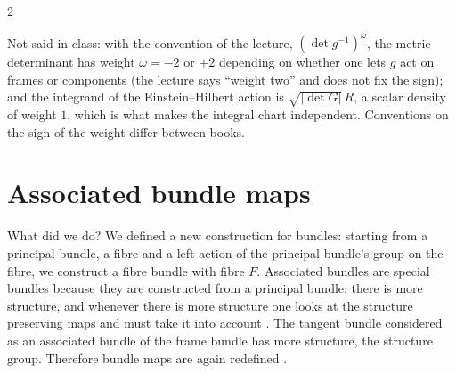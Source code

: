 \begin{paracol}{2}
\begin{coursenote}
Not said in class: with the convention of the lecture, $(\det g^{-1})^\omega$, the metric determinant has weight $\omega=-2$ or $+2$ depending on whether one lets $g$ act on frames or components (the lecture says ``weight two'' and does not fix the sign); and the integrand of the Einstein--Hilbert action is $\sqrt{|\det G|}\,R$, a scalar density of weight $1$, which is what makes the integral chart independent. Conventions on the sign of the weight differ between books. 
\end{coursenote}

\section{Associated bundle maps}\label{sec:ab-maps}

What did we do? We defined a new construction for bundles: starting from a principal bundle, a fibre and a left action of the principal bundle's group on the fibre, we construct a fibre bundle with fibre $F$. Associated bundles are special bundles because they are constructed from a principal bundle: there is more structure, and whenever there is more structure one looks at the structure preserving maps and must take it into account   . The tangent bundle considered as an associated bundle of the frame bundle has more structure, the structure group. Therefore bundle maps are again redefined .


\end{paracol}
